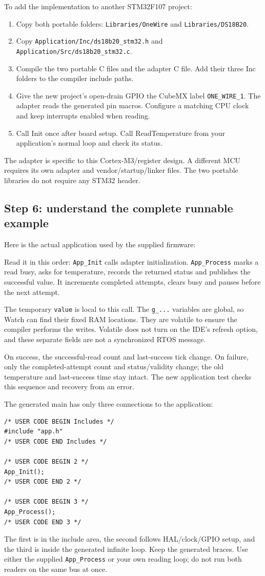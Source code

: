 To add the implementation to another STM32F107 project:
\begin{enumerate}
\item Copy both portable folders: \texttt{Libraries/OneWire} and \texttt{Libraries/DS18B20}.
\item Copy \texttt{Application/Inc/ds18b20\_stm32.h} and \texttt{Application/Src/ds18b20\_stm32.c}.
\item Compile the two portable C files and the adapter C file. Add their three Inc folders to the compiler include paths.
\item Give the new project's open-drain GPIO the CubeMX label \texttt{ONE\_WIRE\_1}. The adapter reads the generated pin macros. Configure a matching CPU clock and keep interrupts enabled when reading.
\item Call Init once after board setup. Call ReadTemperature from your application's normal loop and check its status.
\end{enumerate}
The adapter is specific to this Cortex-M3/register design. A different MCU requires its own adapter and vendor/startup/linker files. The two portable libraries do not require any STM32 header.

\subsection{Step 6: understand the complete runnable example}
Here is the actual application used by the supplied firmware:

Read it in this order: \texttt{App\_Init} calls adapter initialization. \texttt{App\_Process} marks a read busy, asks for temperature, records the returned status and publishes the successful value. It increments completed attempts, clears busy and pauses before the next attempt.

The temporary \texttt{value} is local to this call. The \texttt{g\_...} variables are global, so Watch can find their fixed RAM locations. They are volatile to ensure the compiler performs the writes. Volatile does not turn on the IDE's refresh option, and these separate fields are not a synchronized RTOS message.

On success, the successful-read count and last-success tick change. On failure, only the completed-attempt count and status/validity change; the old temperature and last-success time stay intact. The new application test checks this sequence and recovery from an error.

The generated main has only three connections to the application:
\begin{lstlisting}
/* USER CODE BEGIN Includes */
#include "app.h"
/* USER CODE END Includes */

/* USER CODE BEGIN 2 */
App_Init();
/* USER CODE END 2 */

/* USER CODE BEGIN 3 */
App_Process();
/* USER CODE END 3 */
\end{lstlisting}
The first is in the include area, the second follows HAL/clock/GPIO setup, and the third is inside the generated infinite loop. Keep the generated braces. Use either the supplied \texttt{App\_Process} or your own reading loop; do not run both readers on the same bus at once.

